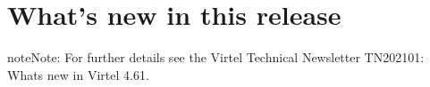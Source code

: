 \documentclass[letterpaper,10pt,english]{sphinxmanual}
\begin{document}
\newpage

\ignorespaces 

\chapter{What’s new in this release}
\label{\detokenize{Migration_Guide:what-s-new-in-this-release}}\label{\detokenize{Migration_Guide:index-9}}
\begin{sphinxadmonition}{note}{Note:}
\sphinxAtStartPar
For further details see the Virtel Technical Newsletter TN202101: Whats new in Virtel 4.61.
\end{sphinxadmonition}



\renewcommand{\indexname}{Index}
\printindex
\end{document}
